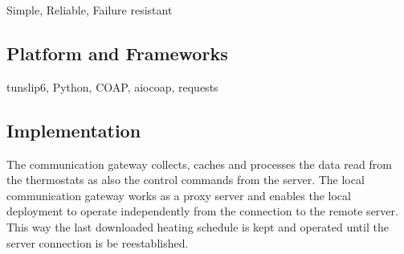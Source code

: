 Simple, Reliable, Failure resistant

\subsection{Platform and Frameworks}

tunslip6, Python, COAP, aiocoap, requests

\subsection{Implementation}

The communication gateway collects, caches and processes the data read from the thermostats as also the control commands from the server. The local communication gateway works as a proxy server and enables the local deployment to operate independently from the connection to the remote server. This way the last downloaded heating schedule is kept and operated until the server connection is be reestablished. 

